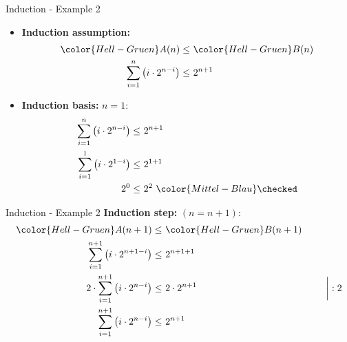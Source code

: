 
\begin{frame}{Induction - Example 2}
  \begin{itemize}
    \item
      \textbf{Induction assumption:}
      \begin{align*}
        {\color{Hell-Gruen}A}(n) \leq &~ {\color{Hell-Gruen}B}(n)\\
        \sum \limits^n_{i=1} \left(i \cdot 2^{n-i} \right) \leq &~ 2^{n+1}
      \end{align*}
    \item
      \textbf{Induction basis:}
      $n = 1$:
      \begin{align*}
        \sum \limits^n_{i=1} \left(i \cdot 2^{n-i} \right) \leq &~ 2^{n+1}\\
        \sum \limits^1_{i=1} \left(i \cdot 2^{1-i} \right) \leq &~ 2^{1+1}\\
        2^0 \leq &~ 2^2 ~{\color{Mittel-Blau}\checked}
      \end{align*}
  \end{itemize}
\end{frame}


\begin{frame}{Induction - Example 2}
  \textbf{Induction step:}
  $(n = n +1)$:
  \begin{align*}
    {\color{Hell-Gruen}A}(n+1) \leq &~ {\color{Hell-Gruen}B}(n+1)\\
    \sum\limits^{n+1}_{i=1} \left(i \cdot 2^{n+1-i} \right)
    \leq &~ 2^{n+1+1}\\
    2 \cdot \sum\limits^{n+1}_{i=1} \left(i \cdot 2^{n-i} \right)
    \leq &~ 2 \cdot 2^{n+1} & \hspace*{1.5em} \bigg\vert :2\\
    \sum\limits^{n+1}_{i=1} \left(i \cdot 2^{n-i} \right)
    \leq &~ 2^{n+1}\\
  \end{align*}
\end{frame}



